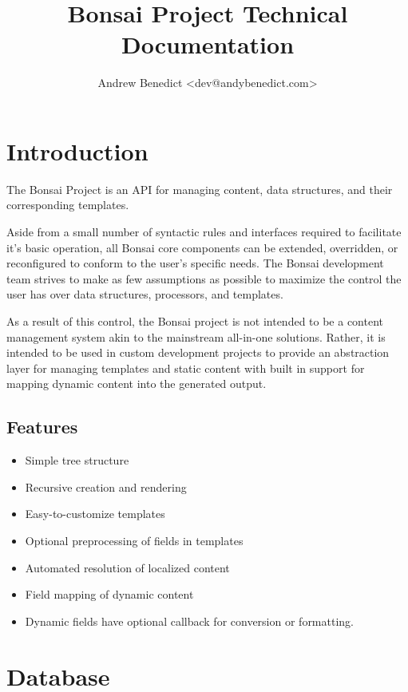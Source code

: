 \documentclass[]{book}
\title{Bonsai Project Technical Documentation}
\author{Andrew Benedict	<dev@andybenedict.com>}
\begin{document}
\maketitle
\tableofcontents

\chapter*{Introduction}

The Bonsai Project is an API for managing content, data structures, and their corresponding templates.

Aside from a small number of syntactic rules and interfaces required to facilitate it's basic operation, all Bonsai core components can be extended, overridden, or reconfigured to conform to the user's specific needs. The Bonsai development team strives to make as few assumptions as possible to maximize the control the user has over data structures, processors, and templates.

As a result of this control, the Bonsai project is not intended to be a content management system akin to the mainstream all-in-one solutions. Rather, it is intended to be used in custom development projects to provide an abstraction layer for managing templates and static content with built in support for mapping dynamic content into the generated output.

\section*{Features}

\begin{itemize}
	\item Simple tree structure
	\item Recursive creation and rendering
	\item Easy-to-customize templates
	\item Optional preprocessing of fields in templates
	\item Automated resolution of localized content
	\item Field mapping of dynamic content
	\item Dynamic fields have optional callback for conversion or formatting.
\end{itemize}

\chapter{Database}
\end{document}
